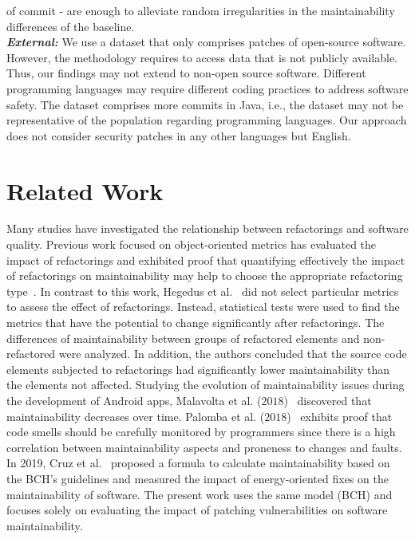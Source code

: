 \documentclass[10pt,conference]{IEEEtran}
\begin{document}
of commit - are enough to
alleviate random irregularities in the maintainability differences of the
baseline. 
\\\textit{\textbf{External:}} We use a dataset that only comprises patches of open-source software.
However, the methodology requires to access data that is not publicly available.
Thus, our findings may not extend to non-open source software. Different programming 
languages may require different coding practices to address software safety. The 
dataset comprises more commits in Java, i.e., the dataset may not be representative 
of the population regarding programming languages. Our approach does not consider 
security patches in any other languages but English.

\section{Related Work}\label{sec:rw}

Many studies have investigated the relationship between refactorings and
software quality. Previous work focused on object-oriented metrics has evaluated the
impact of refactorings and exhibited proof that quantifying effectively the
impact of refactorings on maintainability may help to choose the appropriate
refactoring type~\cite{1167822}. In contrast to this work, Hegedus et
al.~\cite{HEGEDUS2018313} did not select particular metrics to assess the effect
of refactorings. Instead, statistical tests were used to find the metrics that
have the potential to change significantly after refactorings. The differences
of maintainability between groups of refactored elements and non-refactored were
analyzed. In addition, the authors concluded that the source code elements
subjected to refactorings had significantly lower maintainability than the
elements not affected. Studying the evolution of maintainability issues during
the development of Android apps, Malavolta et al. ($2018$)~\cite{8530041}
discovered that maintainability decreases over time. Palomba et al.
($2018$)~\cite{Palomba:2018:DIM:3231288.3231337} exhibits proof that code smells
should be carefully monitored by programmers since there is a high correlation
between maintainability aspects and proneness to changes and faults. In 2019, Cruz et 
al.~\cite{cruz2019energyoriented} proposed a formula to calculate maintainability 
based on the BCH's guidelines and measured the impact of energy-oriented fixes 
on the maintainability of software.
The present work uses the same model (BCH) and focuses solely on evaluating 
the impact of patching vulnerabilities on software maintainability.
\end{document}
